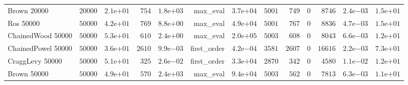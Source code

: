 \begin{longtable}[c]{lrrrrrrrrrrrr}
Brown 20000 & \(20000\) & \( 2.1\)e\(+01\) & \(  754\) & \( 1.8\)e\(+03\) & max\_eval & \( 3.7\)e\(+04\) & \( 5001\) & \(  749\) & \(    0\) & \( 8746\) & \( 2.4\)e\(-03\) & \( 1.5\)e\(+01\) \\
Ros 50000 & \(50000\) & \( 4.2\)e\(+01\) & \(  769\) & \( 8.8\)e\(+00\) & max\_eval & \( 4.9\)e\(+04\) & \( 5001\) & \(  767\) & \(    0\) & \( 8836\) & \( 4.7\)e\(-03\) & \( 1.5\)e\(+01\) \\
ChainedWood 50000 & \(50000\) & \( 5.3\)e\(+01\) & \(  610\) & \( 2.4\)e\(+00\) & max\_eval & \( 2.0\)e\(+05\) & \( 5003\) & \(  608\) & \(    0\) & \( 8043\) & \( 6.6\)e\(-03\) & \( 1.2\)e\(+01\) \\
ChainedPowel 50000 & \(50000\) & \( 3.6\)e\(+01\) & \( 2610\) & \( 9.9\)e\(-03\) & first\_order & \( 4.2\)e\(-04\) & \( 3581\) & \( 2607\) & \(    0\) & \(16616\) & \( 2.2\)e\(-03\) & \( 7.3\)e\(+01\) \\
CraggLevy 50000 & \(50000\) & \( 5.1\)e\(+01\) & \(  325\) & \( 2.6\)e\(-02\) & first\_order & \( 3.3\)e\(+04\) & \( 2870\) & \(  342\) & \(    0\) & \( 4580\) & \( 1.1\)e\(-02\) & \( 1.2\)e\(+01\) \\
Brown 50000 & \(50000\) & \( 4.9\)e\(+01\) & \(  570\) & \( 2.4\)e\(+03\) & max\_eval & \( 9.4\)e\(+04\) & \( 5003\) & \(  562\) & \(    0\) & \( 7813\) & \( 6.3\)e\(-03\) & \( 1.1\)e\(+01\) \\
\hline 
\end{longtable}



